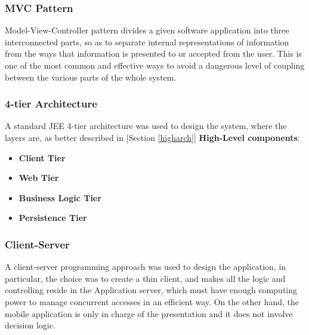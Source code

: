\subsubsection{MVC Pattern}
Model-View-Controller pattern divides a given software application into three interconnected parts, so as to separate internal representations of information from the ways that information is presented to or accepted from the user. This is one of the most common and effective ways to avoid a dangerous level of coupling between the various parts of the whole system.

\subsubsection{4-tier Architecture}
A standard JEE 4-tier architecture was used to design the system, where the layers are, as better described in [Section \ref{higharch}] \textbf{High-Level components}:
\begin{itemize}
\item \textbf{Client Tier}
\item \textbf{Web Tier}
\item \textbf{Business Logic Tier} 
\item \textbf{Persistence Tier}
\end{itemize}

\subsubsection{Client-Server}
A client-server programming approach was used to design the application, in particular, the choice was to create a thin client, and makes all the logic and controlling reside in the Application server, which must have enough computing power to manage concurrent accesses in an efficient way.
On the other hand, the mobile application is only in charge of the presentation and it does not involve decision logic.

